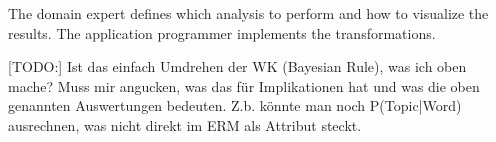 The domain expert defines which analysis to perform and how to visualize the results. The application programmer implements the transformations.

[TODO:] Ist das einfach Umdrehen der WK (Bayesian Rule), was ich oben mache? Muss mir angucken, was das für Implikationen hat und was die oben genannten Auswertungen bedeuten. Z.b. könnte man noch P(Topic|Word) ausrechnen, was nicht direkt im ERM als Attribut steckt.
